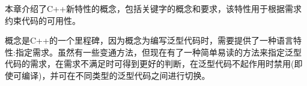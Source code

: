本章介绍了C++新特性的概念，包括关键字的概念和要求，该特性用于根据需求约束代码的可用性。

概念是C++的一个里程碑，因为概念为编写泛型代码时，需要提供了一种语言特性:指定需求。虽然有一些变通方法，但现在有了一种简单易读的方法来指定泛型代码的需求，在需求不满足时可得到更好的判断，在泛型代码不起作用时禁用(即使可编译)，并可在不同类型的泛型代码之间进行切换。
